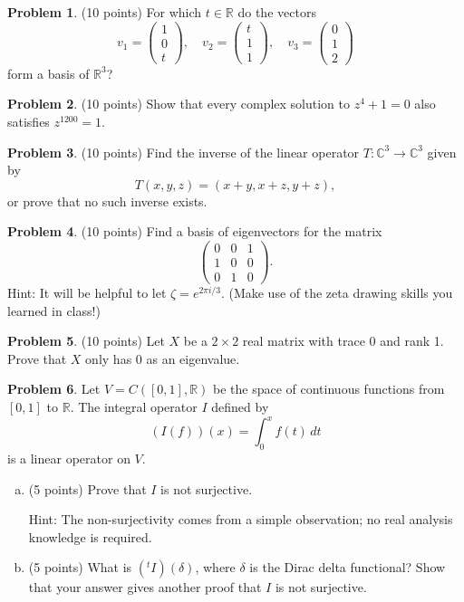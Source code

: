 \documentclass[11pt,oneside]{amsart}
\theoremstyle{definition}
\newtheorem{problem}{Problem}
\newcommand{\bC}{\mathbb{C}}
\newcommand{\bF}{\mathbb{F}}
\newcommand{\bR}{\mathbb{R}}
\newcommand*\dcolvec[1]{\begin{pmatrix}#1\end{pmatrix}}
\begin{document}
    \begin{problem}
        (10 points) For which $t\in\bR$ do the vectors
        \[v_1=\dcolvec{1\\0\\t},\quad v_2=\dcolvec{t\\1\\1}, \quad v_3=\dcolvec{0\\1\\2}\]
        form a basis of $\bR^3$?
    \end{problem}
    \vfill
    \begin{problem}
        (10 points) Show that every complex solution to $z^4+1=0$ also satisfies $z^{1200}=1$.
    \end{problem}
    \vfill
    
    \begin{problem}

        (10 points) Find the inverse of the linear operator $T\colon \bC^3\to\bC^3$ given by
        \[T(x,y,z)=(x+y,x+z,y+z),\]
        or prove that no such inverse exists.
    \end{problem}
    \vfill
    
    \begin{problem}
        (10 points) Find a basis of eigenvectors for the matrix
        \[\begin{pmatrix}0&0&1\\1&0&0\\0&1&0\end{pmatrix}.\]
        Hint: It will be helpful to let $\zeta=e^{2\pi i/3}$. (Make use of the zeta drawing skills you learned in class!)
    \end{problem}
    \vfill
    
    \begin{problem}
        (10 points) Let $X$ be a $2\times 2$ real matrix with trace 0 and rank 1. Prove that $X$ only has 0 as an eigenvalue.
    \end{problem}
    \vfill
    
    \begin{problem}
        Let $V=C([0,1],\bR)$ be the space of continuous functions from $[0,1]$ to $\bR$. The integral operator $I$ defined by
        \[(I(f))(x)=\int_0^x f(t)\,dt\]
        is a linear operator on $V$.
        \begin{enumerate}[(a)]
            \item (5 points) Prove that $I$ is not surjective.
            
            Hint: The non-surjectivity comes from a simple observation; no real analysis knowledge is required.
            \vfill
            \item (5 points) What is $(^tI)(\delta)$, where $\delta$ is the Dirac delta functional? Show that your answer gives another proof that $I$ is not surjective.
            \vfill
        \end{enumerate}
    \end{problem}
    
\end{document}
